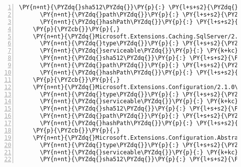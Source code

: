 \begin{Verbatim}[commandchars=\\\{\},numbers=left,firstnumber=1,stepnumber=1,numberblanklines=0]
      \PY{n+nt}{\PYZdq{}sha512\PYZdq{}}\PY{p}{:} \PY{l+s+s2}{\PYZdq{}sha512\PYZhy{}3LkARNRDLIvB5gMMBrOhYkcNOt5vpD7FKHwg80X6zPZnEXnFY8XSnog8UfuocH7gTpJJ0ehUSPrx9EaCdMVo4w==\PYZdq{}}\PY{p}{,}
      \PY{n+nt}{\PYZdq{}path\PYZdq{}}\PY{p}{:} \PY{l+s+s2}{\PYZdq{}microsoft.extensions.caching.memory/2.1.0\PYZhy{}rc1\PYZhy{}final\PYZdq{}}\PY{p}{,}
      \PY{n+nt}{\PYZdq{}hashPath\PYZdq{}}\PY{p}{:} \PY{l+s+s2}{\PYZdq{}microsoft.extensions.caching.memory.2.1.0\PYZhy{}rc1\PYZhy{}final.nupkg.sha512\PYZdq{}}
    \PY{p}{\PYZcb{}}\PY{p}{,}
    \PY{n+nt}{\PYZdq{}Microsoft.Extensions.Caching.SqlServer/2.1.0\PYZhy{}rc1\PYZhy{}final\PYZdq{}}\PY{p}{:} \PY{p}{\PYZob{}}
      \PY{n+nt}{\PYZdq{}type\PYZdq{}}\PY{p}{:} \PY{l+s+s2}{\PYZdq{}package\PYZdq{}}\PY{p}{,}
      \PY{n+nt}{\PYZdq{}serviceable\PYZdq{}}\PY{p}{:} \PY{k+kc}{true}\PY{p}{,}
      \PY{n+nt}{\PYZdq{}sha512\PYZdq{}}\PY{p}{:} \PY{l+s+s2}{\PYZdq{}sha512\PYZhy{}Ajlcprfyd+AlgqJho4MVP/uOmbVbboewGkE5RfjIMhO6lIWz+Q870XuYl/wn4RqCA/D6w9FQD+csf7N7uazedw==\PYZdq{}}\PY{p}{,}
      \PY{n+nt}{\PYZdq{}path\PYZdq{}}\PY{p}{:} \PY{l+s+s2}{\PYZdq{}microsoft.extensions.caching.sqlserver/2.1.0\PYZhy{}rc1\PYZhy{}final\PYZdq{}}\PY{p}{,}
      \PY{n+nt}{\PYZdq{}hashPath\PYZdq{}}\PY{p}{:} \PY{l+s+s2}{\PYZdq{}microsoft.extensions.caching.sqlserver.2.1.0\PYZhy{}rc1\PYZhy{}final.nupkg.sha512\PYZdq{}}
    \PY{p}{\PYZcb{}}\PY{p}{,}
    \PY{n+nt}{\PYZdq{}Microsoft.Extensions.Configuration/2.1.0\PYZhy{}rc1\PYZhy{}final\PYZdq{}}\PY{p}{:} \PY{p}{\PYZob{}}
      \PY{n+nt}{\PYZdq{}type\PYZdq{}}\PY{p}{:} \PY{l+s+s2}{\PYZdq{}package\PYZdq{}}\PY{p}{,}
      \PY{n+nt}{\PYZdq{}serviceable\PYZdq{}}\PY{p}{:} \PY{k+kc}{true}\PY{p}{,}
      \PY{n+nt}{\PYZdq{}sha512\PYZdq{}}\PY{p}{:} \PY{l+s+s2}{\PYZdq{}sha512\PYZhy{}rL2MbuAmuXEKJ4ARZt7xAAM1iGLhrIxe7m16iHQTeoHS5BhBtiujr0DOL6+i6gRcaID0CkbZpaT4flXG9wx3BQ==\PYZdq{}}\PY{p}{,}
      \PY{n+nt}{\PYZdq{}path\PYZdq{}}\PY{p}{:} \PY{l+s+s2}{\PYZdq{}microsoft.extensions.configuration/2.1.0\PYZhy{}rc1\PYZhy{}final\PYZdq{}}\PY{p}{,}
      \PY{n+nt}{\PYZdq{}hashPath\PYZdq{}}\PY{p}{:} \PY{l+s+s2}{\PYZdq{}microsoft.extensions.configuration.2.1.0\PYZhy{}rc1\PYZhy{}final.nupkg.sha512\PYZdq{}}
    \PY{p}{\PYZcb{}}\PY{p}{,}
    \PY{n+nt}{\PYZdq{}Microsoft.Extensions.Configuration.Abstractions/2.1.0\PYZhy{}rc1\PYZhy{}final\PYZdq{}}\PY{p}{:} \PY{p}{\PYZob{}}
      \PY{n+nt}{\PYZdq{}type\PYZdq{}}\PY{p}{:} \PY{l+s+s2}{\PYZdq{}package\PYZdq{}}\PY{p}{,}
      \PY{n+nt}{\PYZdq{}serviceable\PYZdq{}}\PY{p}{:} \PY{k+kc}{true}\PY{p}{,}
      \PY{n+nt}{\PYZdq{}sha512\PYZdq{}}\PY{p}{:} \PY{l+s+s2}{\PYZdq{}sha512\PYZhy{}7hdJxpO1g68bE3FbFHZr/WiWjkwA5UHRMZDGKhZD1uT9qwsYt8GxeNbGapEi3HJKL2OGAuDknR3rLG0CoQ6pvw==\PYZdq{}}\PY{p}{,}

\end{Verbatim}
